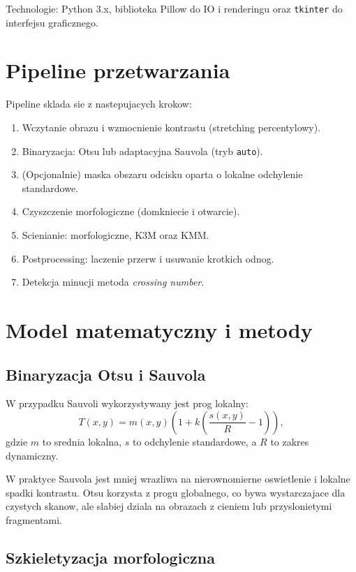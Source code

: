 \documentclass[12pt,a4paper]{article}
\begin{document}
Technologie: Python 3.x, biblioteka Pillow do IO i renderingu oraz \texttt{tkinter} do interfejsu graficznego.

\section{Pipeline przetwarzania}

Pipeline sklada sie z nastepujacych krokow:
\begin{enumerate}
    \item Wczytanie obrazu i wzmocnienie kontrastu (stretching percentylowy).
    \item Binaryzacja: Otsu lub adaptacyjna Sauvola (tryb \texttt{auto}).
    \item (Opcjonalnie) maska obszaru odcisku oparta o lokalne odchylenie standardowe.
    \item Czyszczenie morfologiczne (domkniecie i otwarcie).
    \item Scienianie: morfologiczne, K3M oraz KMM.
    \item Postprocessing: laczenie przerw i usuwanie krotkich odnog.
    \item Detekcja minucji metoda \emph{crossing number}.
\end{enumerate}

\section{Model matematyczny i metody}

\subsection{Binaryzacja Otsu i Sauvola}

W przypadku Sauvoli wykorzystywany jest prog lokalny:
\[
T(x,y)=m(x,y)\left(1+k\left(\frac{s(x,y)}{R}-1\right)\right),
\]
gdzie \(m\) to srednia lokalna, \(s\) to odchylenie standardowe, a \(R\) to zakres dynamiczny.

W praktyce Sauvola jest mniej wrazliwa na nierownomierne oswietlenie i lokalne spadki kontrastu.
Otsu korzysta z progu globalnego, co bywa wystarczajace dla czystych skanow, ale slabiej dziala
na obrazach z cieniem lub przyslonietymi fragmentami.

\subsection{Szkieletyzacja morfologiczna}
\end{document}
